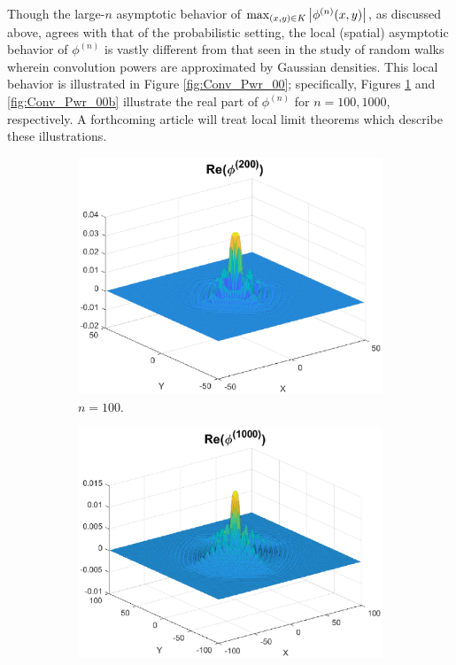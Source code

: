 \documentclass[11pt, letter]{book}
\newenvironment{example}
  {\pushQED{\qed}\renewcommand{\qedsymbol}{$\triangle$}\examplex}
  {\popQED\endexamplex}
\begin{document}
\begin{example}
\noindent Though the large-$n$ asymptotic behavior of $\max_{(x,y)\in K}\abs{\phi^{(n)}(x,y)}$, as discussed above, agrees with that of the probabilistic setting, the local (spatial) asymptotic behavior of $\phi^{(n)}$ is vastly different from that seen in the study of random walks wherein convolution powers are approximated by Gaussian densities. This local behavior is illustrated in Figure \ref{fig:Conv_Pwr_00}; specifically, Figures \ref{fig:Conv_Pwr_00a} and \ref{fig:Conv_Pwr_00b} illustrate the real part of $\phi^{(n)}$ for $n = 100, 1000$, respectively. A forthcoming article will treat local limit theorems which describe these illustrations. 

\begin{figure}[!htb]
    \begin{subfigure}{0.49\textwidth}
    \centering
    \includegraphics[scale=0.58]{Fig6a.eps}
    \caption{$n = 100$.}
    \label{fig:Conv_Pwr_00a}
    \end{subfigure}
    \begin{subfigure}{0.49\textwidth}
    \centering
    \includegraphics[scale=0.58]{Fig6b.eps}

\end{subfigure}
\end{figure}
\end{example}
\end{document}
